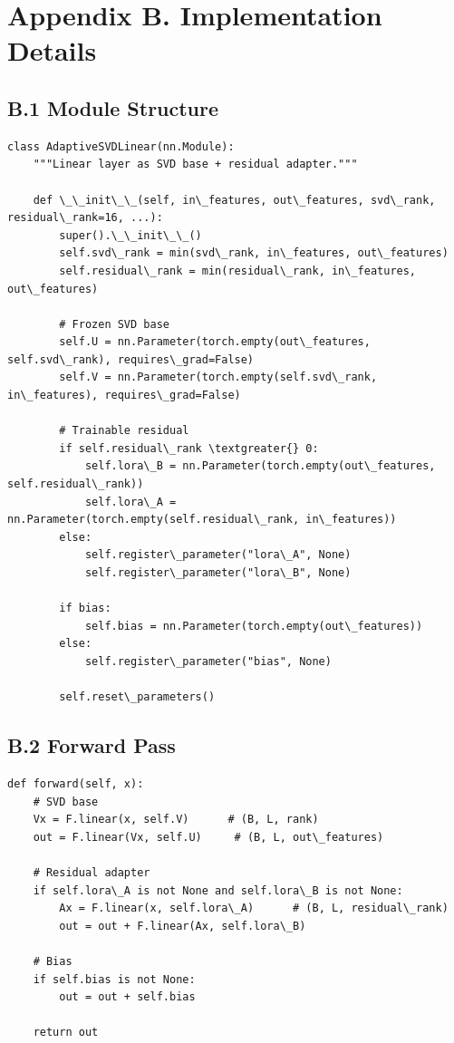 
\section{Appendix B. Implementation Details}

\subsection{B.1 Module Structure}

\begin{lstlisting}
class AdaptiveSVDLinear(nn.Module):
    """Linear layer as SVD base + residual adapter."""
    
    def \_\_init\_\_(self, in\_features, out\_features, svd\_rank, residual\_rank=16, ...):
        super().\_\_init\_\_()
        self.svd\_rank = min(svd\_rank, in\_features, out\_features)
        self.residual\_rank = min(residual\_rank, in\_features, out\_features)
        
        # Frozen SVD base
        self.U = nn.Parameter(torch.empty(out\_features, self.svd\_rank), requires\_grad=False)
        self.V = nn.Parameter(torch.empty(self.svd\_rank, in\_features), requires\_grad=False)
        
        # Trainable residual
        if self.residual\_rank \textgreater{} 0:
            self.lora\_B = nn.Parameter(torch.empty(out\_features, self.residual\_rank))
            self.lora\_A = nn.Parameter(torch.empty(self.residual\_rank, in\_features))
        else:
            self.register\_parameter("lora\_A", None)
            self.register\_parameter("lora\_B", None)
        
        if bias:
            self.bias = nn.Parameter(torch.empty(out\_features))
        else:
            self.register\_parameter("bias", None)
        
        self.reset\_parameters()
\end{lstlisting}

\subsection{B.2 Forward Pass}

\begin{lstlisting}
def forward(self, x):
    # SVD base
    Vx = F.linear(x, self.V)      # (B, L, rank)
    out = F.linear(Vx, self.U)     # (B, L, out\_features)
    
    # Residual adapter
    if self.lora\_A is not None and self.lora\_B is not None:
        Ax = F.linear(x, self.lora\_A)      # (B, L, residual\_rank)
        out = out + F.linear(Ax, self.lora\_B)
    
    # Bias
    if self.bias is not None:
        out = out + self.bias
    
    return out
\end{lstlisting}

